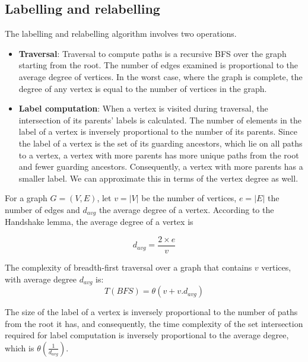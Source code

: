 \subsection{Labelling and relabelling}
The labelling and relabelling algorithm involves two operations.
\begin{itemize}
	\item \textbf{Traversal}: Traversal to compute paths is a recursive BFS over the graph starting from the root. The number of edges examined is proportional to the average degree of vertices. In the worst case, where the graph is complete, the degree of any vertex is equal to the number of vertices in the graph. 
	
	\item \textbf{Label computation}: When a vertex is visited during traversal, the intersection of its parents' labels is calculated. The number of elements in the label of a vertex is inversely proportional to the number of its parents. Since the label of a vertex is the set of its guarding ancestors, which lie on all paths to a vertex, a vertex with more parents has more unique paths from the root and fewer guarding ancestors. Consequently, a vertex with more parents has a smaller label. We can approximate this in terms of the vertex degree as well. 
\end{itemize}

For a graph $G = (V, E)$, let $v = \lvert V \rvert$ be the number of vertices, $e = \lvert E \rvert$ the number of edges and $d_{avg}$ the average degree of a vertex. According to the Handshake lemma, the average degree of a vertex is 

\begin{equation}
	\mathit{d_{avg}} = \frac{2 \times e}{v} 
\end{equation}


The complexity of breadth-first traversal over a graph that contains $v$ vertices, with average degree $d_{avg}$ is:
\begin{equation*}
	T(\mathit{BFS}) =\theta(v + v.d_{avg}) 
\end{equation*}

The size of the label of a vertex is inversely proportional to the number of paths from the root it has, and consequently, the time complexity of the set intersection required for label computation is inversely proportional to the average degree, which is $\theta(\frac{1}{d_{avg}})$. 

